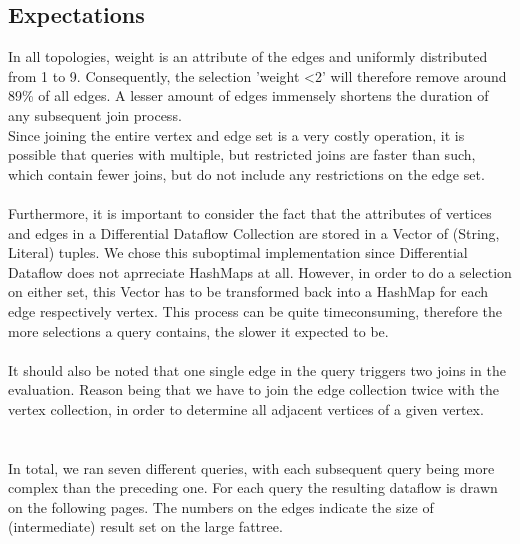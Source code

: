 \documentclass[11pt,singlecolumn]{scrartcl}
\begin{document}
\subsection{Expectations}
In all topologies, weight is an attribute of the edges and uniformly distributed from 1 to 9. Consequently, the selection 'weight \textless 2' will therefore remove around 89\% of all edges. A lesser amount of edges immensely shortens the duration of any subsequent join process.\\ Since joining the entire vertex and edge set is a very costly operation, it is possible that queries with multiple, but restricted joins are faster than such, which contain fewer joins, but do not include any restrictions on the edge set. \\\\
Furthermore, it is important to consider the fact that the attributes of vertices and edges in a Differential Dataflow Collection are stored in a Vector of (String, Literal) tuples. We chose this suboptimal implementation since Differential Dataflow does not aprreciate HashMaps at all. However, in order to do a selection on either set, this Vector has to be transformed back into a HashMap for each edge respectively vertex. This process can be quite timeconsuming, therefore the more selections a query contains, the slower it expected to be.\\\\
It should also be noted that one single edge in the query triggers two joins in the evaluation. Reason being that we have to join the edge collection twice with the vertex collection, in order to determine all adjacent vertices of a given vertex.\\\\\\
In total, we ran seven different queries, with each subsequent query being more complex than the preceding one. For each query the resulting dataflow is drawn on the following pages. The numbers on the edges indicate the size of (intermediate) result set on the large fattree.\clearpage
\end{document}
